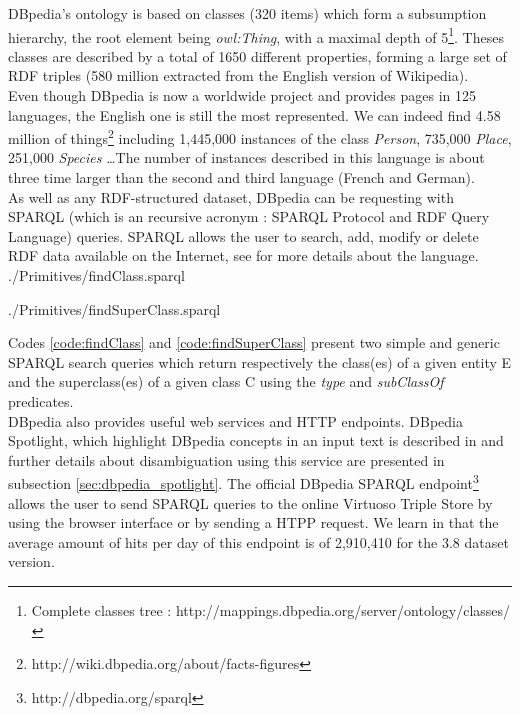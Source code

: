 DBpedia's ontology is based on classes (320 items) which form a subsumption hierarchy, the root element being \emph{owl:Thing}, with a maximal depth of 5\footnote{Complete classes tree : http://mappings.dbpedia.org/server/ontology/classes/}. Theses classes are described by a total of 1650 different properties, forming a large set of RDF triples (580 million extracted from the English version of Wikipedia).\\

Even though DBpedia is now a worldwide project and provides pages in 125 languages, the English one is still the most represented. We can indeed find 4.58 million of things\footnote{http://wiki.dbpedia.org/about/facts-figures} including 1,445,000 instances of the class \textit{Person}, 735,000 \textit{Place}, 251,000 \textit{Species} \dots The number of instances described in this language is about three time larger than the second and third language (French and German). \\

As well as any RDF-structured dataset, DBpedia can be requesting with SPARQL (which is an recursive acronym : SPARQL Protocol and RDF Query Language) queries. SPARQL allows the user to search, add, modify or delete RDF data available on the Internet, see \cite{prud2008sparql} for more details about the language. \\


	{./Primitives/findClass.sparql}


	{./Primitives/findSuperClass.sparql}

Codes \ref{code:findClass} and \ref{code:findSuperClass} present two simple and generic SPARQL search queries which return respectively the class(es) of a given entity E and the superclass(es) of a given class C using the \textit{type} and \textit{subClassOf} predicates.\\

DBpedia also provides useful web services and HTTP endpoints. DBpedia Spotlight, which highlight DBpedia concepts in an input text is described in \cite{mendes2011dbpedia} and further details about disambiguation using this service are presented in subsection \ref{sec:dbpedia_spotlight}. The official DBpedia SPARQL endpoint\footnote{http://dbpedia.org/sparql} allows the user to send SPARQL queries to the online Virtuoso Triple Store by using the browser interface or by sending a HTPP request. We learn in \cite{lehmann2014dbpedia} that the average amount of hits per day of this endpoint is of 2,910,410 for the 3.8 dataset version. \\

